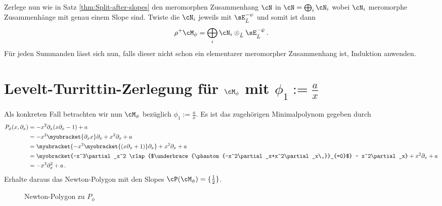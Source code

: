 \begin{comment}
TODO: hier weiter vereinfachen
\end{comment}
Zerlege nun wie in  Satz \ref{thm:Split-after-slopes} den meromorphen
Zusammenhang $\cN$ in $\cN=\bigoplus_i\cN_i$ wobei $\cN_i$ meromorphe
Zusammenhänge mit genau einem Slope sind.
Twiste die $\cN_i$ jeweils mit $\sE^{-\psi}_{\hat L}$ und somit ist dann
\[
\rho^+\cM_{\phi}=\bigoplus_i\cN_i\otimes_{\hat L}\sE^{-\psi}_{\hat L} \,.
\]
Für jeden Summanden lässt sich nun, falls dieser nicht schon ein elementarer
meromorpher Zusammenhang ist, Induktion anwenden.
\begin{comment}
nicht elementar, sondern regulär otimes E
\end{comment}

\section{Levelt-Turrittin-Zerlegung für $\cM_{\phi}$ mit
  $\phi_1:=\frac{a}{x}$}
\begin{comment}
rechtfertigen, das mehr gerechnet wird, als nötig
\end{comment}
Als konkreten Fall betrachten wir nun $\cM_{\phi}$ bezüglich
$\phi_1:=\frac{a}{x}$. 
Es ist das zugehörigen Minimalpolynom gegeben durch
\begin{align*}
P_{\phi}(x,\partial_x) &=-x^2\partial_x (x\partial_x-1)+a
\\&=-x^2\myubracket{\partial_xx}\partial_x+x^2\partial_x+a
\\&=\myubracket{-x^2\myobracket{(x\partial_x+1)}\partial_x} + x^2\partial_x
  + a
\\&=\myobracket{-x^3\partial_x^2
  \rlap{$\underbrace{\phantom{-x^2\partial_x+x^2\partial_x\,}}_{=0}$}
  - x^2\partial_x}+x^2\partial_x+a
\\&=-x^3\partial_x^2+a \,.
\end{align*}
Erhalte daraus das Newton-Polygon mit den Slopes
$\cP(\cM_{\phi})=\{\frac{1}{2}\}$.
\begin{figure}[H] %
\begin{center}
\end{center}
\caption{Newton-Polygon zu $P_{\phi}$}
\end{figure}
